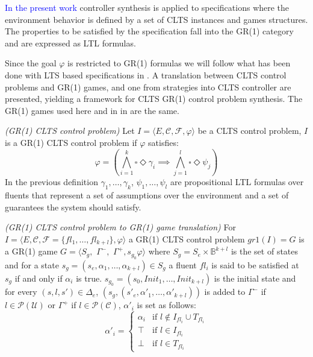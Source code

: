 \textcolor{blue}{In the present work} controller synthesis is applied to specifications where the environment behavior is defined by a set of CLTS instances and games structures. The properties to be satisfied by the specification fall into the GR(1) category and are expressed as LTL formulas.

Since the goal $\varphi$ is restricted to GR(1) formulas we will follow what has been done with LTS based specifications in \cite{DBLP:phd/ethos/DIppolito13}. A translation between CLTS control problems and GR(1) games, and one from strategies into CLTS controller are presented, yielding a framework for CLTS GR(1) control problem synthesis. The GR(1) games used here and in in \cite{DBLP:phd/ethos/DIppolito13} are the same.

\begin{definition}\label{def:gr1_clts_control_problem} \emph{(GR(1) CLTS control problem)} 
	Let $I = \langle E, \mathcal{C}, \mathcal{F}, \varphi \rangle$ be a CLTS control problem, $I$ is a GR(1) CLTS control problem if $\varphi$ satisfies: 
	\[\varphi = (\bigwedge_{i=1}^k\square \Diamond \gamma_i \implies \bigwedge_{j=1}^l\square \Diamond \psi_j)\]
	In the previous definition $\gamma_1, \ldots , \gamma_k$, $\psi_1, \ldots , \psi_l$ are propositional LTL formulas over fluents that represent a set of assumptions over the environment and a set of guarantees the system should satisfy.
\end{definition}

\begin{definition}\label{def:clts_to_gr1_translation} \emph{(GR(1) CLTS control problem to GR(1) game translation)} 
For $I = \langle E, \mathcal{C}, \mathcal{F}=\lbrace fl_1, \ldots, fl_{k+l} \rbrace, \varphi \rangle$ a GR(1) CLTS control problem $gr1(I)=G$ is a GR(1) game $G = \langle S_g,$ $\Gamma^-,$ $\Gamma^+,s_{g_0}\varphi \rangle$ where $S_g = S_e \times \mathbb{B}^{k+l}$ is the set of states and for a state $s_g=(s_e,\alpha_1,\ldots,\alpha_{k+l}) \in S_g$ a fluent
$fl_i$ is said to be satisfied at $s_g$ if and only if $\alpha_i$ is true.
$s_{g_0}=(s_0,Init_1,\ldots,Init_{k+l})$ is the initial state and for every $(s,l,s')\in \Delta_e$, $(s_g,(s'_e,\alpha'_1,\ldots,\alpha'_{k+l}))$ is added to $\Gamma^-$ if $l \in \mathcal{P}(\mathcal{U})$ or $\Gamma^+$ if $l \in \mathcal{P}(\mathcal{C})$, $\alpha'_i$ is set as follows:
\[
\alpha'_i = \begin{cases}
\alpha_i & \text{if } l \notin I_{fl_i} \cup T_{fl_i} \\
\top & \text{if } l \in I_{fl_i}\\
\bot & \text{if } l \in T_{fl_i}
\end{cases}
\]
\end{definition}

